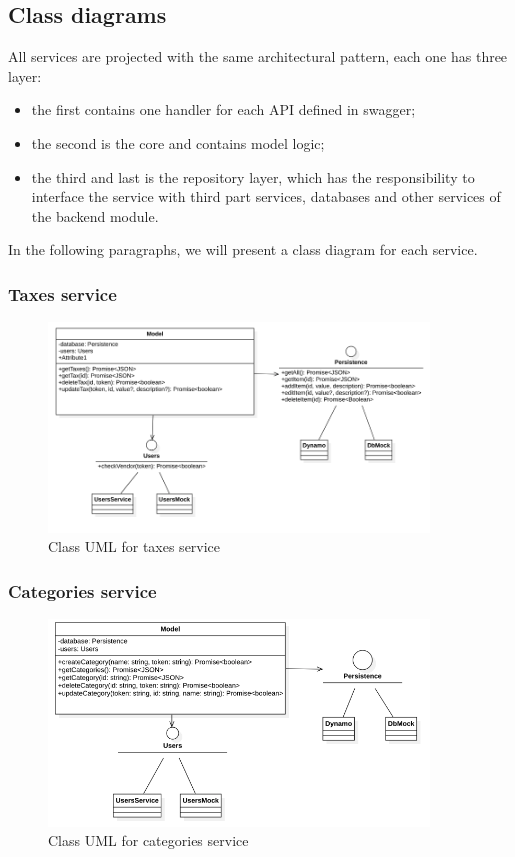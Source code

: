 \subsection{Class diagrams}\label{_classDiagram}
All services are projected with the same architectural pattern, each one has three layer:
\begin{itemize}
    \item the first contains one handler for each API defined in swagger;
    \item the second is the core and contains model logic;
    \item the third and last is the repository layer, which has the responsibility to interface the
          service with third part services, databases and other services of the backend module.
\end{itemize}
In the following paragraphs, we will present a class diagram for each service.


\subsubsection{Taxes service}
\begin{figure}[H]
    \includegraphics[width=0.9\textwidth]{res/images/class-diagrams/taxes.png}
    \caption{Class UML for taxes service}
\end{figure}

\subsubsection{Categories service}
\begin{figure}[H]
    \includegraphics[width=0.9\textwidth]{res/images/class-diagrams/categories.png}
    \caption{Class UML for categories service}
\end{figure}

